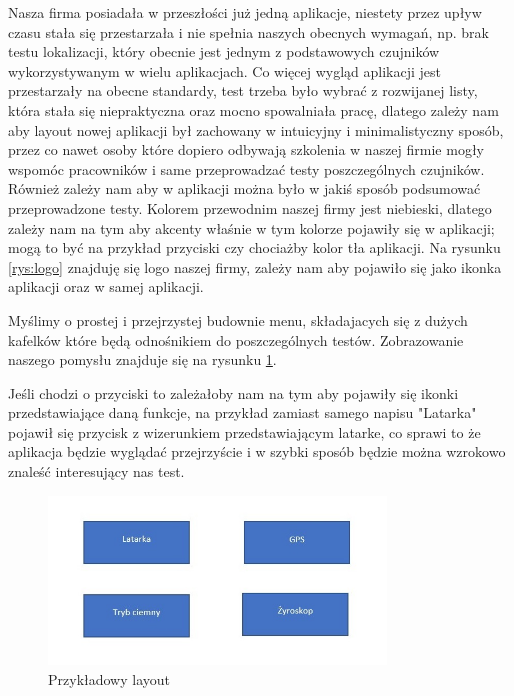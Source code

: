 \newpage

Nasza firma posiadała w przeszłości już jedną aplikacje, niestety przez upływ czasu stała się przestarzała i nie spełnia naszych obecnych wymagań, np. brak testu lokalizacji, który obecnie jest jednym z podstawowych czujników wykorzystywanym w wielu aplikacjach. Co więcej wygląd aplikacji jest przestarzały na obecne standardy, test trzeba było wybrać z rozwijanej listy, która stała się niepraktyczna oraz mocno spowalniała pracę, dlatego zależy nam aby layout nowej aplikacji był zachowany w intuicyjny i minimalistyczny sposób, przez co nawet osoby które dopiero odbywają szkolenia w naszej firmie mogły wspomóc pracowników i same przeprowadzać testy poszczególnych czujników. Również zależy nam aby w aplikacji można było w jakiś sposób podsumować przeprowadzone testy. Kolorem przewodnim naszej firmy jest niebieski, dlatego zależy nam na tym aby akcenty właśnie w tym kolorze pojawiły się w aplikacji; mogą to być na przykład przyciski czy chociażby kolor tła aplikacji. Na rysunku \ref{rys:logo} znajduję się logo naszej firmy, zależy nam aby pojawiło się jako ikonka aplikacji oraz w samej aplikacji. \newline 

Myślimy o prostej i przejrzystej budownie menu, składajacych się z dużych kafelków które będą odnośnikiem do poszczególnych testów. Zobrazowanie naszego pomysłu znajduje się na rysunku \ref{rys:layout}. \newline

Jeśli chodzi o przyciski to zależałoby nam na tym aby pojawiły się ikonki przedstawiające daną funkcje, na przykład zamiast samego napisu "Latarka" pojawił się przycisk z wizerunkiem przedstawiającym latarke, co sprawi to że aplikacja będzie wyglądać przejrzyście i w szybki sposób będzie można wzrokowo znaleść interesujący nas test. 

\begin{figure}[!hbt]
	\begin{center}
		\includegraphics[angle=360, width=0.80\textwidth]{rys/punkt1/Layout_1.jpg}
		\caption{Przykładowy layout}
		\label{rys:layout}
	\end{center}
\end{figure}





  


 
 
 
 
 
